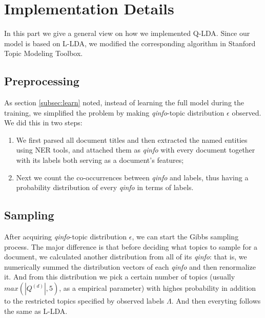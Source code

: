 \section{Implementation Details}
\label{sec:implement}

In this part we give a general view on how we implemented Q-LDA. Since our model is based on L-LDA, we modified the corresponding algorithm in Stanford Topic Modeling Toolbox.

\subsection{Preprocessing}

As section \ref{subsec:learn} noted, instead of learning the full model during the training, we simplified the problem by making \emph{qinfo}-topic distribution $\epsilon$ observed. We did this in two steps:

\begin{enumerate}
\item We first parsed all document titles and then extracted the named entities using NER tools, and attached them as \emph{qinfo} with every document together with its labels both serving as a document's features;
\item Next we count the co-occurrences between \emph{qinfo} and labels, thus having a probability distribution of every \emph{qinfo} in terms of labels.
\end{enumerate}

\subsection{Sampling}

After acquiring \emph{qinfo}-topic distribution $\epsilon$, we can start the Gibbs sampling process. The major difference is that before deciding what topics to sample for a document, we calculated another distribution from all of its \emph{qinfo}: that is, we numerically summed the distribution vectors of each \emph{qinfo} and then renormalize it. And from this distribution we pick a certain number of topics (usually $max(|Q^{(d)}|, 5)$, as a empirical parameter) with highes probability in addition to the restricted topics specified by observed labels $\Lambda$. And then everyting follows the same as L-LDA.